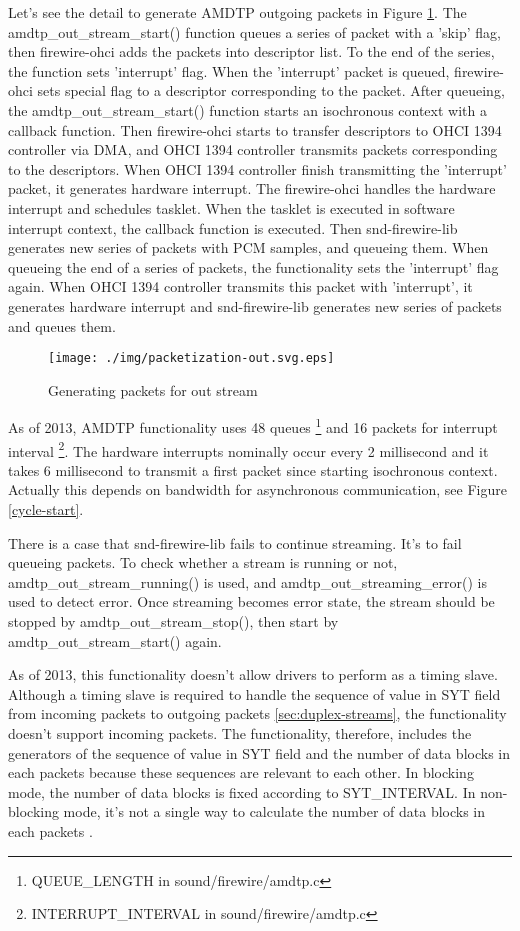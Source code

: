 \documentclass[onecolumn]{article}
\begin{document}
Let's see the detail to generate AMDTP outgoing packets in Figure \ref{fig:packetization-out}. The amdtp\_out\_stream\_start() function queues a series of packet with a 'skip' flag, then firewire-ohci adds the packets into descriptor list. To the end of the series, the function sets 'interrupt' flag. When the 'interrupt' packet is queued, firewire-ohci sets special flag to a descriptor corresponding to the packet. After queueing, the amdtp\_out\_stream\_start() function starts an isochronous context with a callback function. Then firewire-ohci starts to transfer descriptors to OHCI 1394 controller via DMA, and OHCI 1394 controller transmits packets corresponding to the descriptors. When OHCI 1394 controller finish transmitting the 'interrupt' packet, it generates hardware interrupt. The firewire-ohci handles the hardware interrupt and schedules tasklet. When the tasklet is executed in software interrupt context, the callback function is executed. Then snd-firewire-lib generates new series of packets with PCM samples, and queueing them. When queueing the end of a series of packets, the functionality sets the 'interrupt' flag again. When OHCI 1394 controller transmits this packet with 'interrupt', it generates hardware interrupt and snd-firewire-lib generates new series of packets and queues them.

\begin{figure}[H]
	\centering
	\texttt{[image: ./img/packetization-out.svg.eps]}
	\caption{{Generating packets for out stream}}
	\label{fig:packetization-out}
\end{figure}

As of 2013, AMDTP functionality uses 48 queues \footnote{QUEUE\_LENGTH in sound/firewire/amdtp.c} and 16 packets for interrupt interval \footnote{INTERRUPT\_INTERVAL in sound/firewire/amdtp.c}. The hardware interrupts nominally occur every 2 millisecond and it takes 6 millisecond to transmit a first packet since starting isochronous context. Actually this depends on bandwidth for asynchronous communication, see Figure \ref{cycle-start}.

There is a case that snd-firewire-lib fails to continue streaming. It's to fail queueing packets. To check whether a stream is running or not, amdtp\_out\_stream\_running() is used, and amdtp\_out\_streaming\_error() is used to detect error. Once streaming becomes error state, the stream should be stopped by amdtp\_out\_stream\_stop(), then start by amdtp\_out\_stream\_start() again.

As of 2013, this functionality doesn't allow drivers to perform as a timing slave. Although a timing slave is required to handle the sequence of value in SYT field from incoming packets to outgoing packets \ref{sec:duplex-streams}, the functionality doesn't support incoming packets. The functionality, therefore, includes the generators of the sequence of value in SYT field and the number of data blocks in each packets because these sequences are relevant to each other. In blocking mode, the number of data blocks is fixed according to SYT\_INTERVAL. In non-blocking mode, it's not a single way to calculate the number of data blocks in each packets \cite{iec61883-6-1, iec61883-6-2}.
\end{document}
